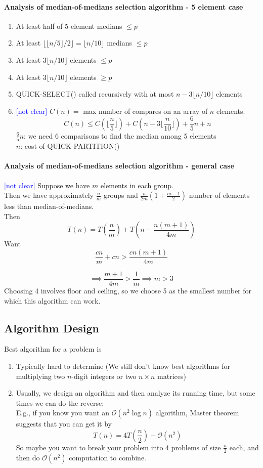 \documentclass[11pt]{article}
\begin{document}
\paragraph{Analysis of median-of-medians selection algorithm - 5 element case}
\begin{enumerate}
	\item At least half of 5-element medians $\leq p$
	\item At least $\lfloor\lfloor n / 5 \rfloor / 2 \rfloor = \lfloor n / 10 \rfloor$ medians $\leq p$
	\item At least $3 \lfloor n / 10 \rfloor$ elements $\leq p$
	\item At least $3 \lfloor n / 10 \rfloor$ elements $\geq p$
	\item QUICK-SELECT() called recursively with at most $n - 3 \lfloor n / 10 \rfloor$ elements 
	\item \textcolor{blue}{[not clear]} $C(n) = $ max number of compares on an array of $n$ elements.
	$$C(n) \leq C(\lfloor \frac{n}{5} \rfloor) + C(n - 3\lfloor \frac{n}{10} \rfloor) + \frac{6}{5}n + n$$
	$\frac{6}{5}n$: we need 6 comparisons to find the median among 5 elements  \\
	$n$: cost of QUICK-PARTITION()
\end{enumerate}

\paragraph{Analysis of median-of-medians selection algorithm - general case}
\textcolor{blue}{[not clear]}
Suppose we have $m$ elements in each group. \\
Then we have approximately $\frac{n}{m}$ groups and $\frac{n}{2m}(1 + \frac{m-1}{2})$ number of elements less than median-of-medians. \\
Then $$T(n) = T(\frac{n}{m}) + T(n - \frac{n(m+1)}{4m}) $$
Want $$\frac{cn}{m} + cn > \frac{cn(m+1)}{4m}$$

$$\implies \frac{m+1}{4m} > \frac{1}{m} \implies m > 3$$
Choosing 4 involves floor and ceiling, so we choose 5 as the smallest number for which this algorithm can work.

\subsection{Algorithm Design}
Best algorithm for a problem is
\begin{enumerate}
	\item Typically hard to determine (We still don't know best algorithms for multiplying two $n$-digit integers or two $n \times n$ matrices)
	\item Usually, we design an algorithm and then analyze its running time, but some times we can do the reverse: \\
	E.g., if you know you want an $\mathcal{O}(n^2 \log n)$ algorithm, Master theorem suggests that you can get it by
	$$T(n) = 4T(\frac{n}{2}) + \mathcal{O}(n^2)$$
	So maybe you want to break your problem into 4 problems of size $\frac{n}{2}$ each, and then do $\mathcal{O}(n^2)$ computation to combine.
\end{enumerate}
\end{document}
